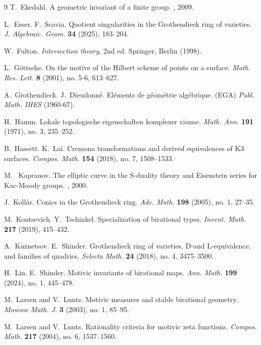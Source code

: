 \documentclass{amsart}
\theoremstyle{definition}
\numberwithin{equation}{section}
\begin{document}
\begin{thebibliography}{9}
T.~Ekedahl.
\newblock A geometric invariant of a finite group.
, 2009.

L.~Esser. F.~Scavia. Quotient singularities in the Grothendieck ring of varieties. \emph{J. Algebraic. Geom.} {\bf 34} (2025), 183--204.

W.~Fulton. \emph{Intersection theory}, 2nd ed. Springer, Berlin (1998).

L.~G\"{o}ttsche. On the motive of the Hilbert scheme of points on a surface. \emph{Math. Res. Lett.} {\bf 8}
(2001), no. 5-6, 613--627.

A.~Grothendieck. J.~Dieudonn{\'e}. El{\'e}ments de g{\'e}om{\'e}trie alg{\'e}brique. (EGA) \emph{Publ. Math. IHES} (1960-67).

H.~Hamm. Lokale topologische eigenschaften komplexer r{\"a}ume. \emph{Math. Ann.} {\bf 191} (1971), no. 3, 235--252.

B.~Hassett. K.~Lai. Cremona transformations and derived equivalences of K3 surfaces. \emph{Compos. Math.} {\bf 154} (2018), no. 7, 1508--1533.

M. ~Kapranov.
\newblock The elliptic curve in the S-duality theory and Eisenstein series for Kac-Moody groups.
, 2000.

J.~Koll{\'a}r. Conics in the Grothendieck ring. \emph{Adv. Math.} {\bf 198} (2005), no. 1, 27--35.

M.~Kontsevich. Y.~Tschinkel. Specialization of birational types. \emph{Invent. Math.} {\bf 217} (2019), 415--432.

A.~Kuznetsov. E.~Shinder. Grothendieck ring of varieties, D-and L-equivalence, and families of quadrics. \emph{Selecta Math.} {\bf 24} (2018), no. 4, 3475--3500.

H.~Lin. E.~Shinder. Motivic invariants of birational maps. \emph{Ann. Math.} {\bf 199} (2024), no. 1, 445--478.

M.~Larsen and V.~Lunts. Motivic measures and stable birational geometry.
\emph{Moscow Math. J.} {\bf 3} (2003), no. 1, 85--95.
		
M.~Larsen and V.~Lunts.  Rationality criteria for motivic zeta functions. \emph{Compos. Math.} {\bf 217} (2004), no. 6, 1537--1560.


\end{thebibliography}
\end{document}
